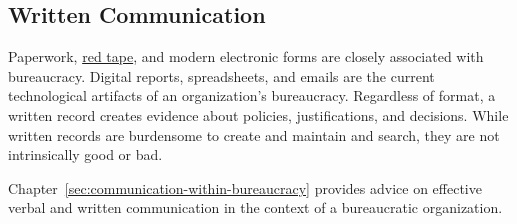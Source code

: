 \subsection*{Written Communication\label{sec:written-communication}}

Paperwork,  \href{https://en.wikipedia.org/wiki/Red_tape}{red tape},
and modern electronic forms are closely associated with bureaucracy.
Digital reports, spreadsheets, and emails are the current technological artifacts of an organization's bureaucracy. Regardless of format, a written record creates evidence about policies, justifications, and decisions. %
While written records are burdensome to create and maintain and search, they are not intrinsically good or bad. 

Chapter~\ref{sec:communication-within-bureaucracy} 
provides advice on effective verbal and written communication in the context of a bureaucratic organization. 
